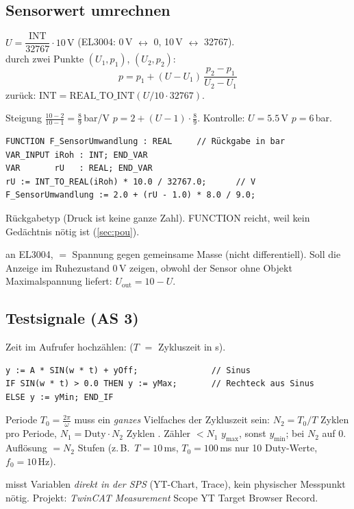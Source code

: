 \label{sec:filter}

\subsection{Sensorwert umrechnen}
\label{rez:skalierung}
\begin{rezept}
 $U=\dfrac{\text{INT}}{32767}\cdot10\,\text{V}$
\quad(EL3004: 0\,V $\leftrightarrow$ 0, 10\,V $\leftrightarrow$ 32767).\\
 durch zwei Punkte $(U_1,p_1)$, $(U_2,p_2)$:
\[ p = p_1 + (U-U_1)\,\frac{p_2-p_1}{U_2-U_1} \]
 zurück: $\text{INT}=\text{REAL\_TO\_INT}(U/10\cdot32767)$.
\end{rezept}
\begin{bsp}[MEP HS24: Drucksensor 1\,V $=$ 2\,bar, 10\,V $=$ 10\,bar]
Steigung $\frac{10-2}{10-1}=\frac{8}{9}$\,bar/V \ra
$p=2+(U-1)\cdot\frac{8}{9}$. Kontrolle: $U=5.5$\,V \ra $p=6$\,bar.
\begin{lstlisting}
FUNCTION F_SensorUmwandlung : REAL     // Rückgabe in bar
VAR_INPUT iRoh : INT; END_VAR
VAR       rU   : REAL; END_VAR
rU := INT_TO_REAL(iRoh) * 10.0 / 32767.0;      // V
F_SensorUmwandlung := 2.0 + (rU - 1.0) * 8.0 / 9.0;
\end{lstlisting}
Rückgabetyp  (Druck ist keine ganze Zahl). FUNCTION reicht,
weil kein Gedächtnis nötig ist (\ref{sec:pou}).
\end{bsp}
 an EL3004,  $=$ Spannung gegen
gemeinsame Masse (nicht differentiell). Soll die Anzeige im Ruhezustand
0\,V zeigen, obwohl der Sensor ohne Objekt Maximalspannung liefert:
$U_{\text{out}}=10-U$.

\subsection{Testsignale (AS 3)}
\label{sec:signale}
Zeit im Aufrufer hochzählen:  ($T$ $=$ Zykluszeit in s).
\begin{lstlisting}
y := A * SIN(w * t) + yOff;               // Sinus
IF SIN(w * t) > 0.0 THEN y := yMax;       // Rechteck aus Sinus
ELSE y := yMin; END_IF
\end{lstlisting}
\begin{formel}
Periode $T_0=\frac{2\pi}{\omega}$ muss ein \emph{ganzes} Vielfaches der
Zykluszeit sein: $N_2=T_0/T$ Zyklen pro Periode, $N_1=\text{Duty}\cdot N_2$
Zyklen . Zähler $<N_1$ \ra $y_{\max}$, sonst $y_{\min}$; bei $N_2$
auf 0. Auflösung $=N_2$ Stufen (z.\,B.\ $T=10$\,ms, $T_0=100$\,ms \ra nur
10 Duty-Werte, $f_0=10$\,Hz).
\end{formel}
 misst Variablen \emph{direkt in der SPS} (YT-Chart,
Trace), kein physischer Messpunkt nötig. Projekt: \emph{TwinCAT
Measurement} \ra Scope YT \ra Target Browser \ra Record.

